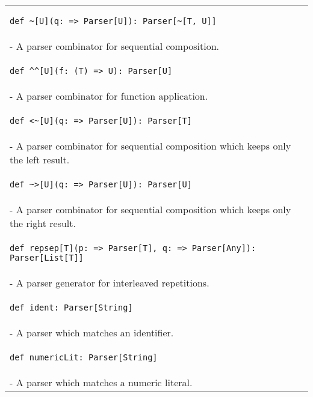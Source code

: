 \begin{table}[t]
\centering
\begin{tabular}{l}
\hline
\begin{lstlisting}
def ~[U](q: => Parser[U]): Parser[~[T, U]]
\end{lstlisting} \\
\hspace{.2in}- A parser combinator for sequential composition. \\
\hline
\begin{lstlisting}
def ^^[U](f: (T) => U): Parser[U]
\end{lstlisting} \\
\hspace{.2in}- A parser combinator for function application. \\
\hline
\begin{lstlisting}
def <~[U](q: => Parser[U]): Parser[T]
\end{lstlisting} \\
\hspace{.2in}- A parser combinator for sequential composition which keeps only the left result. \\
\hline
\begin{lstlisting}
def ~>[U](q: => Parser[U]): Parser[U]
\end{lstlisting} \\
\hspace{.2in}- A parser combinator for sequential composition which keeps only the right result. \\
\hline
\begin{lstlisting}
def repsep[T](p: => Parser[T], q: => Parser[Any]): Parser[List[T]]
\end{lstlisting} \\
\hspace{.2in}- A parser generator for interleaved repetitions. \\
\hline
\begin{lstlisting}
def ident: Parser[String]
\end{lstlisting} \\
\hspace{.2in}- A parser which matches an identifier. \\
\hline
\begin{lstlisting}
def numericLit: Parser[String]
\end{lstlisting} \\
\hspace{.2in}- A parser which matches a numeric literal. \\

\end{tabular}
\end{table}
